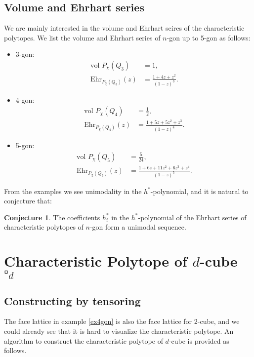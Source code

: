 \documentclass[12pt]{article}
\theoremstyle{definition}
\newtheorem{conj}[thm]{Conjecture}
\numberwithin{equation}{subsection}
\begin{document}
\subsection{Volume and Ehrhart series}
We are mainly interested in the volume and Ehrhart seires of the characteristic polytopes. 
We list the volume and Ehrhart series of $n$-gon up to 5-gon as follows:
\begin{itemize}
    \item 3-gon: 
    \begin{align*}
    \text{vol }P_{\chi}(Q_3) &= 1, \\
    \text{Ehr}_{P_{\chi}(Q_3)}(z) &= \frac{1 + 4z + z^2}{(1 - z)^3}.
    \end{align*}
    \item 4-gon: 
    \begin{align*}
    \text{vol }P_{\chi}(Q_4) &= \frac{1}{2}, \\
    \text{Ehr}_{P_{\chi}(Q_4)}(z) &= \frac{1 + 5z + 5z^2 + z^3}{(1 - z)^4}.
    \end{align*}
    \item 5-gon:
    \begin{align*}
    \text{vol }P_{\chi}(Q_5) &= \frac{5}{24}, \\
    \text{Ehr}_{P_{\chi}(Q_5)}(z) &= \frac{1 + 6z + 11z^2 + 6z^3 + z^4}{(1 - z)^5}.
    \end{align*}
\end{itemize}

From the examples we see unimodality in the $h^*$-polynomial, and it is natural to conjecture that:
\begin{conj}
    The coefficients $h^*_{i}$ in the $h^*$-polynomial of the Ehrhart series of characteristic polytopes of $n$-gon form a unimodal sequence.
\end{conj}

\section{Characteristic Polytope of $d$-cube $\square_{d}$}

\subsection{Constructing by tensoring}
The face lattice in example \ref{ex4gon} is also the face lattice for 2-cube, and we could already see that it is hard to visualize the characteristic polytope. An algorithm to construct the characteristic polytope of $d$-cube is provided as follows.
\end{document}
